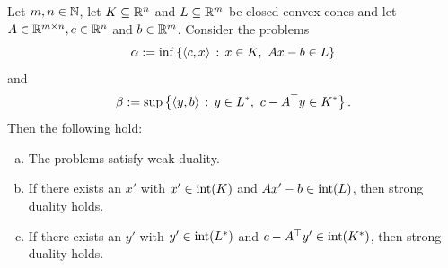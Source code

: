 \begin{corollary}
\label{cor:duality-K-and-L}
 Let $m, n \in \mathbb{N}$, let $K \subseteq \mathbb{R}^n$ and $L \subseteq \mathbb{R}^m$ be closed convex cones and let $A \in \mathbb{R}^{m \times n}, c \in \mathbb{R}^n$ and $b \in \mathbb{R}^m$. Consider the problems
	\begin{equation}
		\label{eq:primal:K:L}
	\alpha := \inf \left\{  \left\langle c , x \right\rangle  \,:\, x \in K, \ A x - b \in L \right\}
	\end{equation}
	and
	\begin{equation}
		\label{eq:dual:K:L}
	\beta := \sup \left\{  \left\langle y , b \right\rangle \,:\, y \in L^\ast, \ c - A^\top y \in K^\ast \right\}.
	\end{equation}
	Then the following hold:
	\begin{enumerate}[(a)]
		\item The problems satisfy weak duality. 
		\item If there exists an $x'$ with $x' \in \operatorname{int}(K)$ and $A x' - b \in \operatorname{int}(L)$, then strong duality holds.
		\item If there exists an $y'$ with $y' \in \operatorname{int}(L^\ast)$ and $c - A^\top y' \in \operatorname{int}(K^\ast)$, then strong duality holds.
	\end{enumerate}
\end{corollary}
